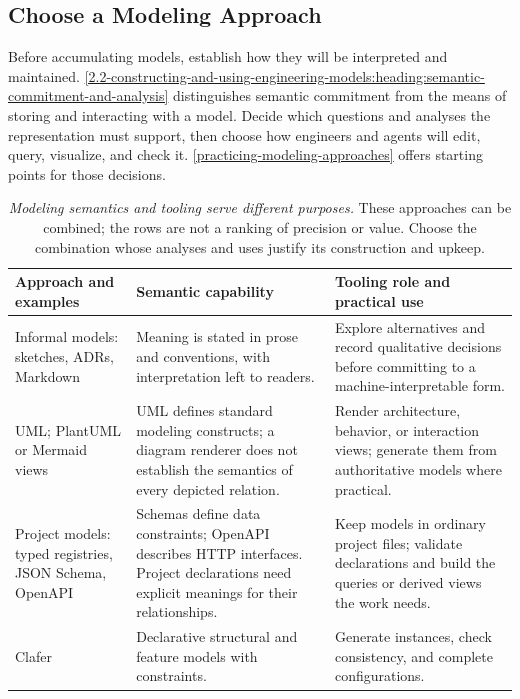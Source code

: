 \subsection{Choose a Modeling Approach}\label{heading:choose-a-modeling-approach}

Before accumulating models, establish how they will be interpreted and maintained. \autoref{2.2-constructing-and-using-engineering-models:heading:semantic-commitment-and-analysis} distinguishes semantic commitment from the means of storing and interacting with a model. Decide which questions and analyses the representation must support, then choose how engineers and agents will edit, query, visualize, and check it. \autoref{practicing-modeling-approaches} offers starting points for those decisions.

{\footnotesize
\begin{longtable}[]{@{}p{.25\linewidth}p{.31\linewidth}p{.34\linewidth}@{}}
\caption[Choosing modeling approaches and tools]{\emph{Modeling semantics and tooling serve different purposes.} These approaches can be combined; the rows are not a ranking of precision or value. Choose the combination whose analyses and uses justify its construction and upkeep.}\label{practicing-modeling-approaches}\\
\toprule
\textbf{Approach and examples} & \textbf{Semantic capability} & \textbf{Tooling role and practical use} \\
\midrule
\endhead
Informal models: sketches, ADRs, Markdown & Meaning is stated in prose and conventions, with interpretation left to readers. & Explore alternatives and record qualitative decisions before committing to a machine-interpretable form. \\
UML; PlantUML or Mermaid views~\citep{omg2017uml,plantumlDocumentation,mermaidDocumentation} & UML defines standard modeling constructs; a diagram renderer does not establish the semantics of every depicted relation. & Render architecture, behavior, or interaction views; generate them from authoritative models where practical. \\
Project models: typed registries, JSON Schema, OpenAPI~\citep{jsonSchemaDocumentation,openapi2026spec} & Schemas define data constraints; OpenAPI describes HTTP interfaces. Project declarations need explicit meanings for their relationships. & Keep models in ordinary project files; validate declarations and build the queries or derived views the work needs. \\
Clafer~\citep{claferDocumentation} & Declarative structural and feature models with constraints. & Generate instances, check consistency, and complete configurations. \\

\end{longtable}}
